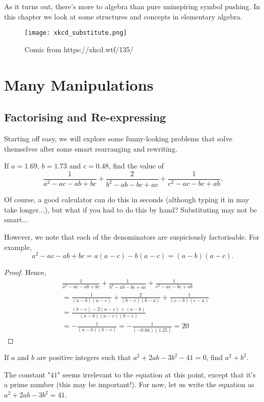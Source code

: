 \documentclass[../jarvis.tex]{subfiles}
\begin{document}
As it turns out, there's more to algebra than pure uninspiring symbol pushing. In this chapter we look at some structures and concepts in elementary algebra.

\begin{figure}[H]
    \centering
    \texttt{[image: xkcd\_substitute.png]}
    \caption{Comic from https://xkcd.wtf/135/}
\end{figure}

\section{Many Manipulations}
\subsection{Factorising and Re-expressing}
Starting off easy, we will explore some funny-looking problems that solve themselves after some smart rearranging and rewriting.

\begin{example}[2013 SMO(J) P15]
    If $a=1.69$, $b=1.73$ and $c=0.48$, find the value of
    $$\frac{1}{a^2-ac-ab+bc}+\frac{2}{b^2-ab-bc+ac}+\frac{1}{c^2-ac-bc+ab}.$$
\end{example}
Of course, a good calculator can do this in seconds (although typing it in may take longer...), but what if you had to do this by hand? Substituting may not be smart...

However, we note that each of the denominators are suspiciously factorisable. For example,
$$a^2-ac-ab+bc=a(a-c)-b(a-c)=(a-b)(a-c).$$

\begin{proof}
    Hence,
\begin{align*}
    & \frac{1}{a^2-ac-ab+bc}+\frac{1}{b^2-ab-bc+ac}+\frac{1}{c^2-ac-bc+ab}\\
    &=\frac{1}{(a-b)(a-c)}+\frac{2}{(b-c)(b-a)}+\frac{1}{(c-b)(c-a)} \\
    &=\frac{(b-c)-2(a-c)+(a-b)}{(a-b)(a-c)(b-c)} \\
    &=-\frac{1}{(a-b)(b-c)} = -\frac{1}{(-0.04)(1.25)} = \boxed{20}
\end{align*}
\end{proof}


\begin{example}[2013 SMO(J) P32]
    If $a$ and $b$ are positive integers such that $a^2+2ab-3b^2-41=0$, find $a^2+b^2$.
\end{example}
The constant "$41$" seems irrelevant to the equation at this point, except that it's a prime number (this may be important!). For now, let us write the equation as $a^2+2ab-3b^2=41$.
\end{document}
